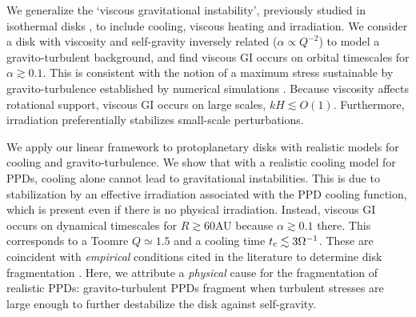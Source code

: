 We generalize the `viscous gravitational instability', previously 
studied in isothermal disks
\citep{lynden-bell74,willerding92,gammie96}, to include 
cooling, viscous heating and irradiation. %
We consider a disk with viscosity and self-gravity inversely
related ($\alpha\propto Q^{-2}$) to model a 
gravito-turbulent background, and find viscous GI occurs on orbital
timescales for $\alpha\gtrsim 0.1$. This is consistent with the notion 
of a maximum stress sustainable by gravito-turbulence established 
by numerical simulations \citep{rice05}. Because viscosity affects 
rotational support, viscous GI occurs on large scales, $kH\lesssim
O(1)$.  Furthermore, irradiation preferentially
stabilizes small-scale perturbations. %
                             

We apply our linear framework to protoplanetary disks with 
realistic models for cooling and gravito-turbulence. 
We show that with a realistic cooling model for PPDs, 
cooling alone cannot lead to gravitational instabilities. This is due
to stabilization by an effective irradiation associated with the PPD
cooling function, which is present even if 
there is no physical irradiation. %
Instead, viscous GI occurs on  
dynamical timescales for $R\gtrsim 60$AU because 
$\alpha\gtrsim0.1$ there. This corresponds to a Toomre $Q\simeq 1.5$ and 
a cooling time $t_\mathrm{c}\lesssim 3\Omega^{-1}$. These are coincident with 
\emph{empirical} conditions cited in the literature to determine disk
fragmentation 
\citep[e.g.][]{rafikov15}. Here, we attribute a \emph{physical}
cause for the fragmentation of realistic PPDs: gravito-turbulent PPDs
fragment when turbulent stresses are large enough to further
destabilize the disk against self-gravity.    



